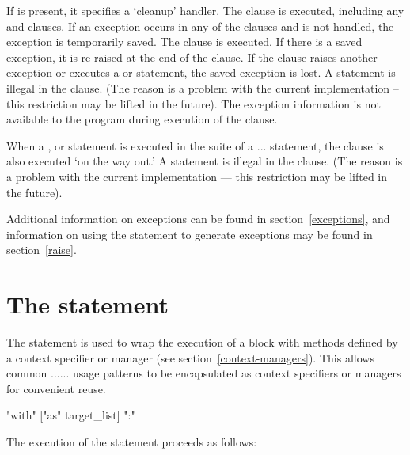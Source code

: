 If  is present, it specifies a `cleanup' handler.  The
 clause is executed, including any  and
 clauses.  If an exception occurs in any of the clauses
and is not handled, the exception is temporarily saved. The
 clause is executed.  If there is a saved exception,
it is re-raised at the end of the  clause.
If the  clause raises another exception or
executes a  or  statement, the saved
exception is lost.  A  statement is illegal in the
 clause.  (The reason is a problem with the current
implementation -- this restriction may be lifted in the future).  The
exception information is not available to the program during execution of
the  clause.

When a ,  or  statement is
executed in the  suite of a ...
statement, the  clause is also executed `on the way out.' A
 statement is illegal in the  clause.
(The reason is a problem with the current implementation --- this
restriction may be lifted in the future).

Additional information on exceptions can be found in
section~\ref{exceptions}, and information on using the 
statement to generate exceptions may be found in section~\ref{raise}.


\section{The  statement\label{with}}


The  statement is used to wrap the execution of a block
with methods defined by a context specifier or manager (see
section~\ref{context-managers}). This allows common
...... usage patterns to
be encapsulated as context specifiers or managers for convenient reuse.

\begin{productionlist}
  {"with"  ["as" target_list] ":" }
\end{productionlist}

The execution of the  statement proceeds as follows:

